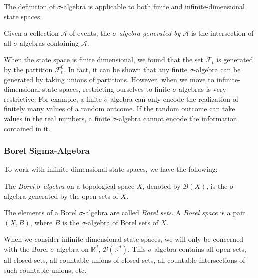 \documentclass[\topdir/lecture\_notes.tex]{subfiles}
\begin{document}
The definition of $\sigma$-algebra is applicable to both finite and infinite-dimensional state spaces.

\begin{defn}
Given a collection $\mathcal{A}$ of events, the \emph{$\sigma$-algebra generated by $\mathcal{A}$} is the intersection of all $\sigma$-algebras containing $\mathcal{A}$.
\end{defn}

When the state space is finite dimensional, we found that the set $\mathcal{F}_{t}$ is generated by the partition $\mathcal{F}_{t}^{0}$. In fact, it can be shown that any finite $\sigma$-algebra can be generated by taking unions of partitions. However, when we move to infinite-dimensional state spaces, restricting ourselves to finite $\sigma$-algebras is very restrictive. For example, a finite $\sigma$-algebra can only encode the realization of finitely many values of a random outcome. If the random outcome can take values in the real numbers, a finite $\sigma$-algebra cannot encode the information contained in it.

\subsubsection{Borel Sigma-Algebra}
To work with infinite-dimensional state spaces, we have the following:
\begin{defn}
The \emph{Borel $\sigma$-algebra} on a topological space $X$, denoted by $\mathcal{B}(X)$, is the $\sigma$-algebra generated by the open sets of $X$.
\end{defn}
The elements of a Borel $\sigma$-algebra are called \emph{Borel sets}. A \emph{Borel space} is a pair $(X,B)$, where $B$ is the $\sigma$-algebra of Borel sets of $X$.

When we consider infinite-dimensional state spaces, we will only be concerned with the Borel $\sigma$-algebra on $\mathbb{R}^{d}$, $\mathcal{B}(\mathbb{R}^d)$. This $\sigma$-algebra contains all open sets, all closed sets, all countable unions of closed sets, all countable intersections of such countable unions, etc. 
\end{document}
